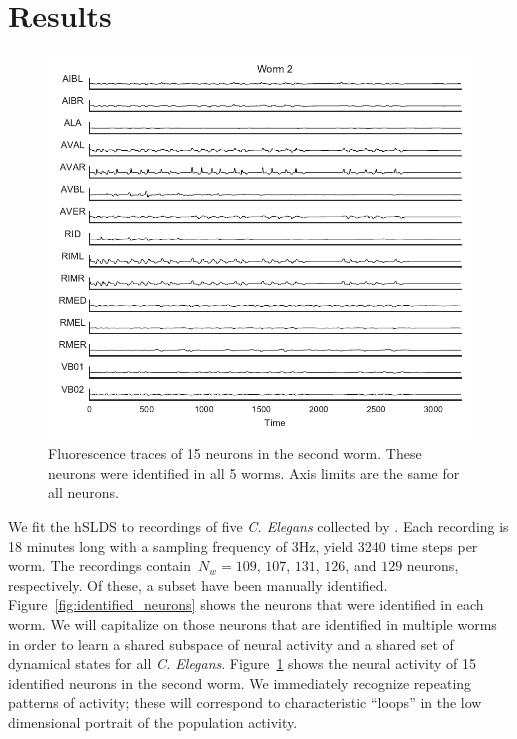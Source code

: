 \documentclass{article}
\begin{document}
\section{Results}
\label{sec:results}
\begin{figure}[t]
\centering%
\includegraphics[width=5.5in]{shared_activity_worm1.pdf} 
\caption{Fluorescence traces of 15 neurons in the second worm. These
  neurons were identified in all 5 worms. Axis limits are the same for
  all neurons. }
\label{fig:shared_activity}
\end{figure}

We fit the hSLDS to recordings of five \textit{C. Elegans} collected
by \cite{kato2015global}. Each recording is 18 minutes long with a
sampling frequency of 3Hz, yield 3240 time steps per worm.  The
recordings contain~$N_w=109$, $107$, $131$, $126$, and $129$ neurons,
respectively. Of these, a subset have been manually identified.
Figure~\ref{fig:identified_neurons} shows the neurons that were
identified in each worm. We will capitalize on those neurons that are
identified in multiple worms in order to learn a shared subspace of
neural activity and a shared set of dynamical states for all
\textit{C. Elegans}. Figure~\ref{fig:shared_activity} shows the neural
activity of 15 identified neurons in the second worm. We immediately
recognize repeating patterns of activity; these will correspond to
characteristic ``loops'' in the low dimensional portrait of the
population activity.
\end{document}
